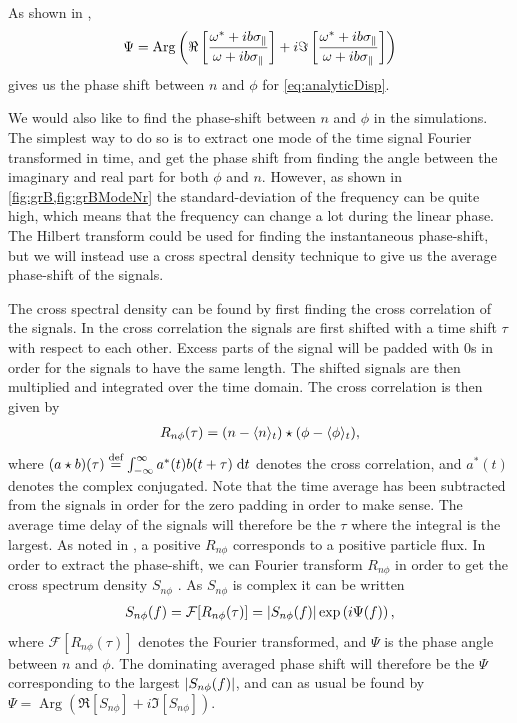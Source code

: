 As shown in \cite{Pecseli2016book},
%
\begin{align}
    \Psi = \operatorname{Arg}\left(
    \Re\left[\frac{\omega^*+ib\sigma_\|}{\omega+ib\sigma_\|}\right]
    +i\Im\left[\frac{\omega^*+ib\sigma_\|}{\omega+ib\sigma_\|}\right]
    \right)
    \label{eq:analPhase}
\end{align}
%
gives us the phase shift between $n$ and $\phi$ for \cref{eq:analyticDisp}.

We would also like to find the phase-shift between $n$ and $\phi$ in the simulations.
The simplest way to do so is to extract one mode of the time signal Fourier transformed in time, and get the phase shift from finding the angle between the imaginary and real part for both $\phi$ and $n$.
However, as shown in \cref{fig:grB,fig:grBModeNr} the standard-deviation of the frequency can be quite high, which means that the frequency can change a lot during the linear phase.
The Hilbert transform could be used for finding the instantaneous phase-shift, but we will instead use a cross spectral density technique to give us the average phase-shift of the signals.

The cross spectral density can be found by first finding the cross correlation of the signals.
In the cross correlation the signals are first shifted with a time shift $\tau$ with respect to each other.
Excess parts of the signal will be padded with $0$s in order for the signals to have the same length.
The shifted signals are then multiplied and integrated over the time domain.
The cross correlation is then given by
%
\begin{align*}
    R_{n\phi}(\tau) = (n-\langle{n}\rangle_t) \star (\phi-\langle{\phi}\rangle_t),
\end{align*}
%
where $(a \star b)(\tau) \overset{\text{def}}{=} \int_{-\infty }^{\infty} {a^{*}(t) b(t+\tau )} \; \text{d} {t}$ denotes the cross correlation, and $a^*(t)$ denotes the complex conjugated.
Note that the time average has been subtracted from the signals in order for the zero padding in order to make sense.
The average time delay of the signals will therefore be the $\tau$ where the integral is the largest.
As noted in \cite{Huld1988}, a positive $R_{n\phi}$ corresponds to a positive particle flux.
In order to extract the phase-shift, we can Fourier transform $R_{n\phi}$ in order to get the cross spectrum density $S_{n\phi}$ .
As $S_{n\phi}$ is complex it can be written
%
\begin{align*}
    S_{n\phi}(f) = \mathcal{F}[R_{n\phi}(\tau)] = \left|S_{n\phi}(f)\right|\exp\left(i\Psi(f)\right),
\end{align*}
%
where $\mathcal{F}[R_{n\phi}(\tau)]$ denotes the Fourier transformed, and $\Psi$ is the phase angle between $n$ and $\phi$.
The dominating averaged phase shift will therefore be the $\Psi$ corresponding to the largest $\left|S_{n\phi}(f)\right|$, and can as usual be found by $\Psi = \operatorname{Arg}(\Re[S_{n\phi}]+i\Im[S_{n\phi}])$.

